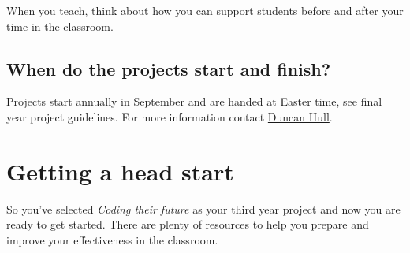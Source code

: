 \documentclass[
  12pt,
]{book}
\begin{document}
When you teach, think about how you can support students before and after your time in the classroom.

\hypertarget{finishing}{%
\subsection{When do the projects start and finish?}\label{finishing}}

Projects start annually in September and are handed at Easter time, see final year project guidelines. For more information contact \protect\hyperlink{Contact}{Duncan Hull}.

\hypertarget{getting-a-head-start}{%
\section{Getting a head start}\label{getting-a-head-start}}

So you've selected \emph{Coding their future} as your third year project and now you are ready to get started. There are plenty of resources to help you prepare and improve your effectiveness in the classroom.
\end{document}
